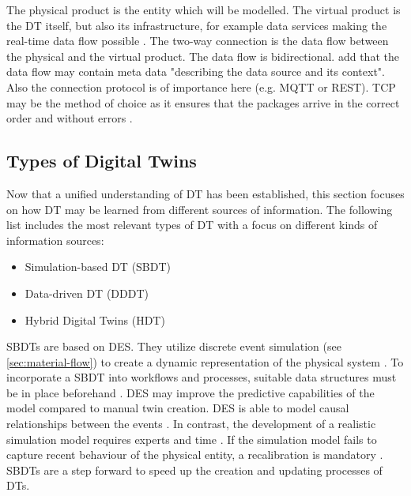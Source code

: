 The physical product is the entity which will be modelled. The virtual product is the DT itself, but also its infrastructure, for example data services making the real-time data flow possible \autocite{Tao2018ijamt}. The two-way connection is the data flow between the physical and the virtual product. The data flow is bidirectional. \citeauthor{zehnder2018representing} add that the data flow may contain meta data "describing the data source and its context". Also the connection protocol is of importance here (e.g. MQTT or REST). TCP may be the method of choice as it ensures that the packages arrive in the correct order and without errors \autocite{li2018learning}.

\subsection{Types of Digital Twins}
\label{sec:types-digital-twins}
Now that a unified understanding of DT has been established, this section focuses on how DT may be learned from different sources of information. The following list includes the most relevant types of DT with a focus on different kinds of information sources:

\begin{itemize}
  \item Simulation-based DT (SBDT) \autocite{Lugaresi2021aifac,martinez2018automatic}
  \item Data-driven DT (DDDT) \autocite{he2019data,Friederich2022}
  \item Hybrid Digital Twins (HDT) \autocite{luo2020hybrid,huang2023hybrid}
\end{itemize}


SBDTs \autocite{Lugaresi2021aifac,martinez2018automatic,boschert2016digital} are based on DES. They utilize discrete event simulation (see \autoref{sec:material-flow}) to create a dynamic representation of the physical system \autocite{schluse2016simulation,pantelides2013online}. To incorporate a SBDT into workflows and processes, suitable data structures must be in place beforehand \autocite{boschert2016digital}. DES may improve the predictive capabilities of the model compared to manual twin creation. DES is able to model causal relationships between the events \autocite{francis2021towards}. In contrast, the development of a realistic simulation model requires experts and time \autocite{Charpentier2014}. If the simulation model fails to capture recent behaviour of the physical entity, a recalibration is mandatory \autocite{Friederich2022}. SBDTs are a step forward to speed up the creation and updating processes of DTs.

